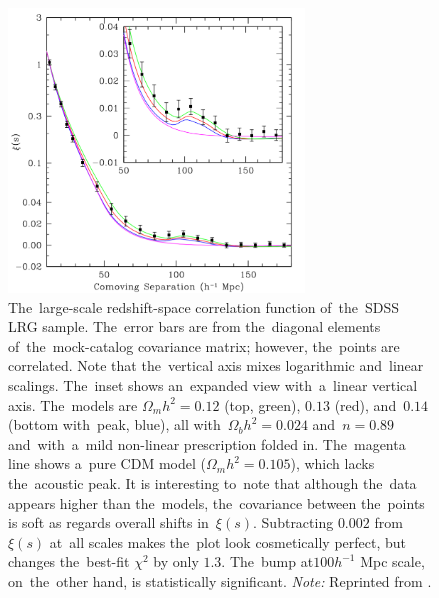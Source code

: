 \begin{figure}[!hbt]
    \centering
    \includegraphics[width=0.7\textwidth]{cosmo_evol/bao_rsd.png}
    \caption{The~large-scale redshift-space correlation function of~the~SDSS LRG sample. The~error bars are from the~diagonal elements of~the~mock-catalog covariance matrix; however, the~points are correlated. Note that the~vertical axis mixes logarithmic and~linear scalings. The~inset shows an~expanded view with~a~linear vertical axis. The~models are $\Omega_mh^2=0.12$ (top, green), $0.13$ (red), and~$0.14$ (bottom with~peak, blue), all with~$\Omega_bh^2=0.024$ and~$n=0.89$ and~with~a~mild non-linear prescription folded in. The~magenta line shows a~pure CDM model ($\Omega_mh^2=0.105$), which lacks the~acoustic peak. It is interesting to~note that although the~data appears higher than the~models, the~covariance between the~points is soft as regards overall shifts in~$\xi(s)$. Subtracting $0.002$ from $\xi(s)$ at~all scales makes the~plot look cosmetically perfect, but changes the~best-fit $\chi^2$ by only $1.3$. The~bump at$100h^{-1}$ Mpc scale, on~the~other hand, is statistically significant. \textit{Note:} Reprinted from \textcite{2005ApJ...633..560E}.}
    \label{fig:xi_s}
\end{figure}

